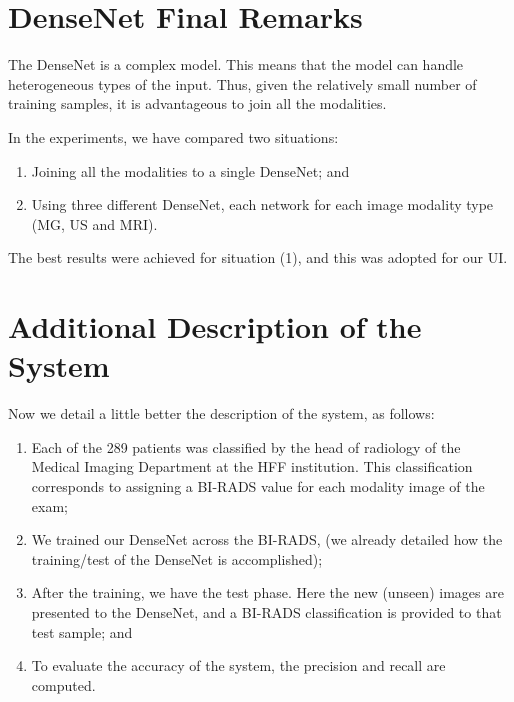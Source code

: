 \section{DenseNet Final Remarks}
\label{sec:app003004}

The DenseNet is a complex model.
This means that the model can handle heterogeneous types of the input.
Thus, given the relatively small number of training samples, it is advantageous to join all the modalities.

\vspace{2mm}

\noindent
In the experiments, we have compared two situations:

\vspace{2mm}

\begin{enumerate}
\item Joining all the modalities to a single DenseNet; and
\item Using three different DenseNet, each network for each image modality type (MG, US and MRI).
\end{enumerate}

\vspace{2mm}

The best results were achieved for situation (1), and this was adopted for our UI.

\section{Additional Description of the System}
\label{sec:app003005}

\vspace{2mm}

\noindent
Now we detail a little better the description of the system, as follows:

\begin{enumerate}
\item Each of the 289 patients was classified by the head of radiology of the Medical Imaging Department at the HFF institution. This classification corresponds to assigning a BI-RADS value for each modality image of the exam;
\item We trained our DenseNet across the BI-RADS, (we already detailed how the  training/test of the DenseNet is accomplished);
\item After the training, we have the test phase. Here the new (unseen) images are presented to the DenseNet, and a BI-RADS classification is provided to that test sample; and
\item To evaluate the accuracy of the system, the precision and recall are computed.
\end{enumerate}

